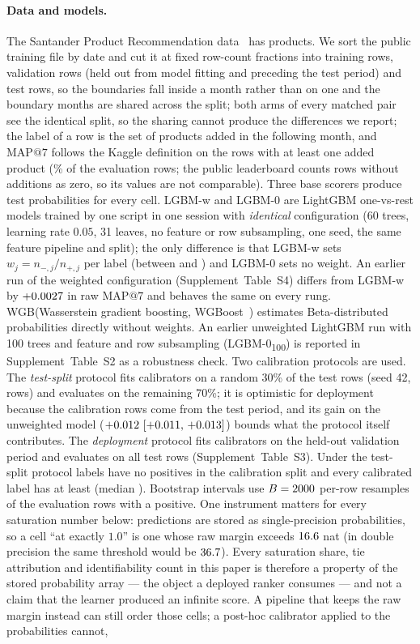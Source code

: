 \documentclass[sigconf,nonacm]{acmart}
\makeatletter
\newcommand{\Sm}{\textsf{LGBM-w}\xspace}
\newcommand{\Wm}{\textsf{WGB}\xspace}
\newcommand{\Nm}{\textsf{LGBM-0}\xspace}
\newcommand{\Nhm}{\textsf{LGBM-0\textsubscript{100}}\xspace}
\newcommand{\mapseven}{\mathrm{MAP}@7\xspace}
\newcommand{\Supp}[1]{Supplement~#1}  %
\makeatother
\begin{document}
\paragraph{Data and models.} The Santander Product Recommendation data~\cite{KaggleSantander2016} has \nnLabels{} products. We sort the public training file by date and cut it at fixed row-count fractions into \nnTrain{} training rows, \nnValRows{} validation rows (held out from model fitting and preceding the test period) and \nnTest{} test rows, so the boundaries fall inside a month rather than on one and the boundary months are shared across the split; both arms of every matched pair see the identical split, so the sharing cannot produce the differences we report; the label of a row is the set of products added in the following month, and $\mapseven$ follows the Kaggle definition on the rows with at least one added product (\nfracRowsWithPos\% of the \nnEvalRows{} evaluation rows; the public leaderboard counts rows without additions as zero, so its values are not comparable). Three base scorers produce test probabilities for every cell. \Sm and \Nm are LightGBM one-vs-rest models trained by one script in one session with \emph{identical} configuration (60 trees, learning rate $0.05$, 31 leaves, no feature or row subsampling, one seed, the same feature pipeline and split); the only difference is that \Sm sets $w_j=n_{-,j}/n_{+,j}$ per label (between \nwMin{} and \nwMax) and \Nm sets no weight. An earlier run of the weighted configuration (\Supp{Table~S4}) differs from \Sm by $+0.0027$ in raw $\mapseven$ and behaves the same on every rung. \Wm (Wasserstein gradient boosting, WGBoost~\cite{Matsubara2024WGBoost}) estimates Beta-distributed probabilities directly without weights. An earlier unweighted LightGBM run with 100 trees and feature and row subsampling (\Nhm) is reported in \Supp{Table~S2} as a robustness check. Two calibration protocols are used. The \emph{test-split} protocol fits calibrators on a random 30\% of the test rows (seed 42, \nnVal{} rows) and evaluates on the remaining 70\%; it is optimistic for deployment because the calibration rows come from the test period, and its gain on the unweighted model ($+0.012~[+0.011,\,+0.013]$) bounds what the protocol itself contributes. The \emph{deployment} protocol fits calibrators on the held-out validation period and evaluates on all test rows (\Supp{Table~S3}). Under the test-split protocol \nSnDead{} labels have no positives in the calibration split and every calibrated label has at least \ncalPosMinAlive{} (median \ncalPosMedAlive). Bootstrap intervals use $B=2000$ per-row resamples of the \nbootN{} evaluation rows with a positive. One instrument matters for every saturation number below: predictions are stored as single-precision probabilities, so a cell ``at exactly $1.0$'' is one whose raw margin exceeds $16.6$ nat (in double precision the same threshold would be $36.7$). Every saturation share, tie attribution and identifiability count in this paper is therefore a property of the stored probability array --- the object a deployed ranker consumes --- and not a claim that the learner produced an infinite score. A pipeline that keeps the raw margin instead can still order those cells; a post-hoc calibrator applied to the probabilities cannot, 
\end{document}
